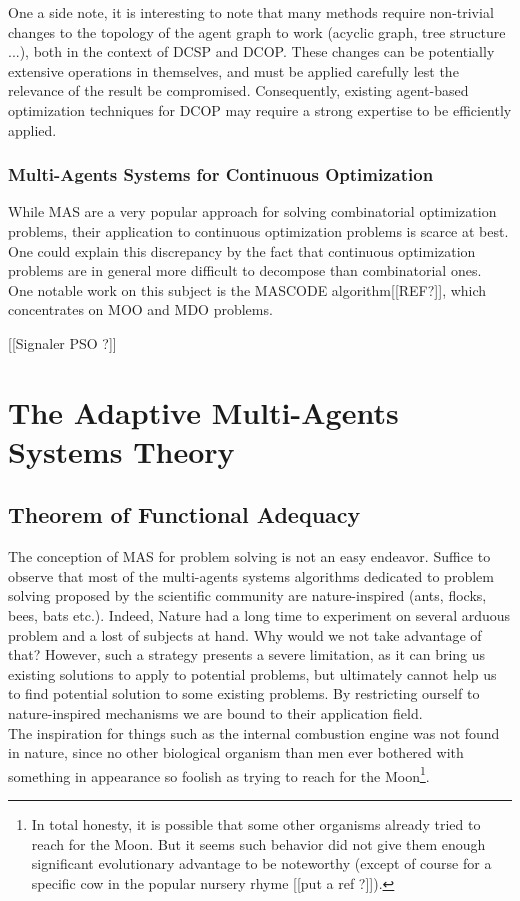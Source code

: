 One a side note, it is interesting to note that many methods require non-trivial changes to the topology of the agent graph to work (acyclic graph, tree structure ...), both in the context of DCSP and DCOP. These changes can  be potentially extensive operations in themselves, and must be applied carefully lest the relevance of the result be compromised. Consequently, existing agent-based optimization techniques for DCOP may require a strong expertise to be efficiently applied\cite{Ka2011.6}.

\subsubsection{Multi-Agents Systems for Continuous Optimization}

While MAS are a very popular approach for solving combinatorial optimization problems, their application to continuous optimization problems is scarce at best. One could explain this discrepancy by the fact that continuous optimization problems are in general more difficult to decompose than combinatorial ones.\\
One notable work on this subject is the MASCODE algorithm[[REF?]], which concentrates on MOO and MDO problems.

[[Signaler PSO ?]]

\section{The Adaptive Multi-Agents Systems Theory}

\subsection{Theorem of Functional Adequacy}

The conception of MAS for problem solving is not an easy endeavor. Suffice to observe that most of the multi-agents systems algorithms dedicated to problem solving proposed by the scientific community are nature-inspired (ants, flocks, bees, bats etc.). Indeed, Nature had a long time to experiment on several arduous problem and a lost of subjects at hand. Why would we not take advantage of that? However, such a strategy presents a severe limitation, as it can bring us existing solutions to apply to potential problems, but ultimately cannot help us to find potential solution to some existing problems. By restricting ourself to nature-inspired mechanisms we are bound to their application field.\\
The inspiration for things such as the internal combustion engine was not found in nature, since no other biological organism than men ever bothered with something in appearance so foolish as trying to reach for the Moon\footnote{In total honesty, it is possible that some other organisms already tried to reach for the Moon. But it seems such behavior did not give them enough significant evolutionary advantage to be noteworthy (except of course for a specific cow in the popular nursery rhyme [[put a ref ?]]).}.

